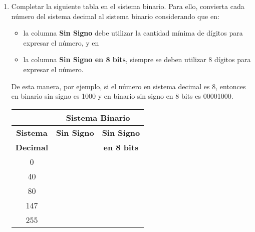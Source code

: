 \documentclass[12pt]{article}
\begin{document}
\begin{enumerate}

    \item Completar la siguiente tabla en el sistema binario. Para ello, 
    convierta cada número del sistema decimal al sistema binario 
    considerando que en: 
    \begin{itemize}
	  \item la columna \textbf{Sin Signo} debe utilizar la cantidad mínima de dígitos para expresar el número, y en
	  \item la columna \textbf{Sin Signo en 8 bits}, siempre se deben utilizar 8 dígitos para expresar el número.
    \end{itemize}
    
    De esta manera, por ejemplo, si el número en sistema decimal es 8, entonces en binario sin signo es 1000 y en binario sin signo en 8 bits es 00001000.

    \begin{center}
		
        \begin{tabular}[t]{|c|c|c|}

        \cline{2-3}

            \multicolumn{1}{c}{}&\multicolumn{2}{|c|}{\textbf{Sistema Binario}}\\

        \hline

            \textbf{Sistema} & \textbf{Sin Signo}& \textbf{Sin Signo}\\

            \textbf{Decimal} & ~ & \textbf{en 8 bits}\\

        \hline

            0 & \hspace{14em}~&\hspace{14em}~\\

        \hline

            40&&\\

        \hline

            80&&\\

        \hline

            147&&\\

        \hline

            255&&\\


\end{tabular}
\end{center}
\end{enumerate}
\end{document}
